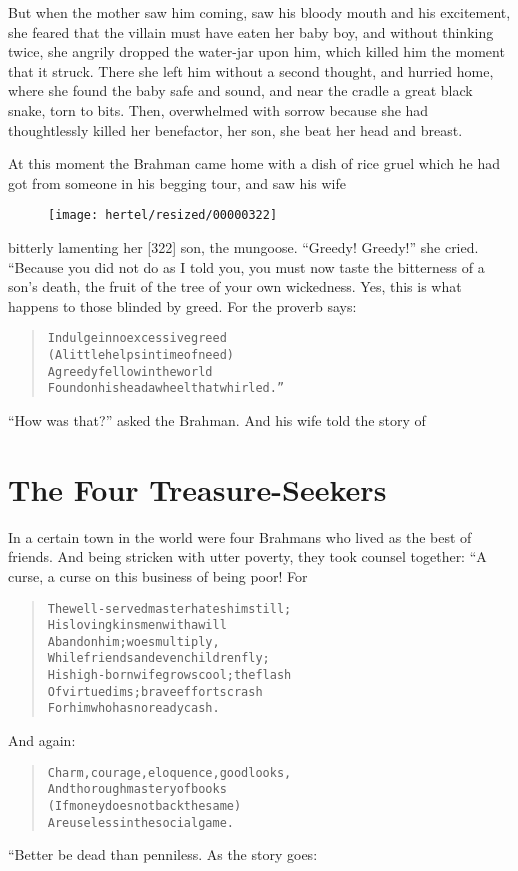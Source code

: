\documentclass[article, twoside, 10pt]{memoir}
\renewenvironment{verbatim}{%
\begin{quote}%
\vskip -10pt%
\begin{alltt}\normalfont\small}{\end{alltt}%
\end{quote}%
\vskip -10pt
} %
\begin{document}
But when the mother saw him coming, saw his bloody mouth and his
excitement, she feared that the villain must have eaten her baby
boy, and without thinking twice, she angrily dropped the water-jar
upon him, which killed him the moment that it struck. There she
left him without a second thought, and hurried home, where she
found the baby safe and sound, and near the cradle a great black
snake, torn to bits. Then, overwhelmed with sorrow because she had
thoughtlessly killed her benefactor, her son, she beat her head and
breast.

At this moment the Brahman came home with a dish of rice gruel
which he had got from someone in his begging tour, and saw his wife
\begin{figure}[p]\texttt{[image: hertel/resized/00000322]}\end{figure}bitterly lamenting her [322] son, the mungoose. ``Greedy! Greedy!''
she cried. “Because you did not do as I told you, you must now
taste the bitterness of a son's death, the fruit of the tree of
your own wickedness. Yes, this is what happens to those blinded by
greed. For the proverb says:

\begin{verbatim}
Indulge in no excessive greed
(A little helps in time of need){\textemdash}
A greedy fellow in the world
Found on his head a wheel that whirled.”
\end{verbatim}
``How was that?'' asked the Brahman. And his wife told the story
of

\chapter{The Four Treasure-Seekers}

In a certain town in the world were four Brahmans who lived as the
best of friends. And being stricken with utter poverty, they took
counsel together: “A curse, a curse on this business of being poor!
For

\begin{verbatim}
The well-served master hates him still;
His loving kinsmen with a will
Abandon him; woes multiply,
While friends and even children fly;
His high-born wife grows cool; the flash
Of virtue dims; brave efforts crash{\textemdash}
For him who has no ready cash.
\end{verbatim}
And again:

\begin{verbatim}
Charm, courage, eloquence, good looks,
And thorough mastery of books
(If money does not back the same)
Are useless in the social game.
\end{verbatim}
“Better be dead than penniless. As the story goes:
\end{document}
